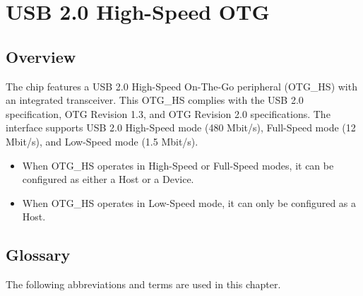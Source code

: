 \documentclass[main\_\_EN.tex]{subfiles}
\begin{document}

\ifglobal
\else
    \listoftodos
    {\let\clearpage\relax \listofdonetodos}
    \tableofcontents
\fi



\hypertarget{usbotghs}{}
\chapter{USB 2.0 High-Speed OTG}
\label{mod:usbotghs}

\section{Overview}
The \chipname{} chip features a USB 2.0 High-Speed On-The-Go peripheral (OTG\_HS) with an integrated transceiver. This OTG\_HS complies with the USB 2.0 specification, OTG Revision 1.3, and OTG Revision 2.0 specifications. The interface supports USB 2.0 High-Speed mode (480 Mbit/s), Full-Speed mode (12 Mbit/s), and Low-Speed mode (1.5 Mbit/s).
\begin{itemize}
    \item When OTG\_HS operates in High-Speed or Full-Speed modes, it can be configured as either a Host or a Device.
    \item When OTG\_HS operates in Low-Speed mode, it can only be configured as a Host.
\end{itemize}

\section{Glossary}

The following abbreviations and terms are used in this chapter.
\end{document}
